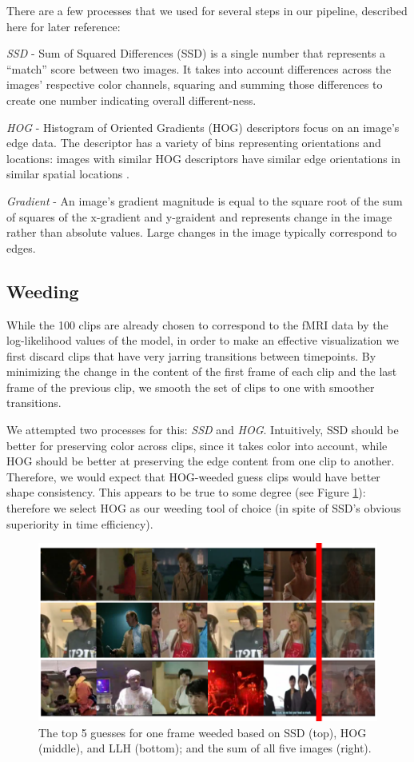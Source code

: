 There are a few processes that we used for several steps in our pipeline, described here for later reference:

\emph{SSD} - Sum of Squared Differences (SSD) is a single number that represents a ``match'' score between two images.  It takes into account differences across the images' respective color channels, squaring and summing those differences to create one number indicating overall different-ness.

\emph{HOG} - Histogram of Oriented Gradients (HOG) descriptors focus on an image's edge data.  The descriptor has a variety of bins representing orientations and locations: images with similar HOG descriptors have similar edge orientations in similar spatial locations \cite{HOG}.

\emph{Gradient} - An image's gradient magnitude is equal to the square root of the sum of squares of the x-gradient and y-graident and represents change in the image rather than absolute values.  Large changes in the image typically correspond to edges.

\subsection{Weeding}
While the 100 clips are already chosen to correspond to the fMRI data by the log-likelihood values of the model, in order to make an effective visualization we first discard clips that have very jarring transitions between timepoints. By minimizing the change in the content of the first frame of each clip and the last frame of the previous clip, we smooth the set of clips to one with smoother transitions.

We attempted two processes for this: \emph{SSD} and \emph{HOG}.  Intuitively, SSD should be better for preserving color across clips, since it takes color into account, while HOG should be better at preserving the edge content from one clip to another.  Therefore, we would expect that HOG-weeded guess clips would have better shape consistency.  This appears to be true to some degree (see Figure \ref{fig:weeding}): therefore we select HOG as our weeding tool of choice (in spite of SSD's obvious superiority in time efficiency).

\begin{figure}
\centering
    \includegraphics[width=0.95\columnwidth]{figures/preproc.png}
\caption{The top 5 guesses for one frame weeded based on SSD (top), HOG (middle), and LLH (bottom); and the sum of all five images (right).}
\label{fig:weeding}
\end{figure}


